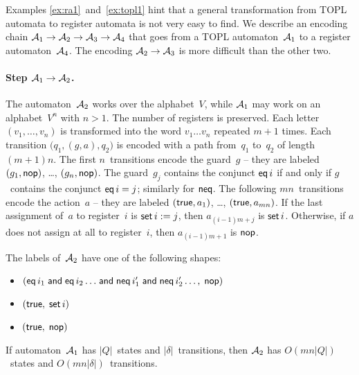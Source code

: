 \documentclass[9pt, preprint]{sigplanconf} %
\theoremstyle{definition}
\theoremstyle{remark}
\begin{document}
Examples \ref{ex:ra1}~and~\ref{ex:topl1} hint that a general  transformation from TOPL automata to register automata is not very easy to find.
We describe an encoding chain ${\cal A}_1\to{\cal A}_2\to{\cal A}_3\to{\cal A}_4$ that goes from a TOPL automaton~${\cal A}_1$ to a register automaton~${\cal A}_4$.
The encoding ${\cal A}_2\to{\cal A}_3$ is more difficult than the other two.

\paragraph{Step ${\cal A}_1\to{\cal A}_2$.}
The automaton~${\cal A}_2$ works over the alphabet~$V$, while ${\cal A}_1$ may work on an alphabet~$V^n$ with $n>1$.
The number of registers is preserved.
Each letter $(v_1,\ldots,v_n)$ is transformed into the word $v_1\ldots v_n$ repeated $m+1$ times.
Each transition $\bigl(q_1,(g,a),q_2\bigr)$ is encoded with a path from~$q_1$ to~$q_2$ of length $(m+1)n$.
The first $n$~transitions encode the guard~$g$ -- they are labeled $(g_1,{\sf nop})$, \dots, $(g_n,{\sf nop})$.
The guard~$g_j$ contains the conjunct ${\sf eq}\,i$ if and only if $g$~contains the conjunct ${\sf eq}\,i=j$; similarly for ${\sf neq}$.
The following $mn$~transitions encode the action~$a$ -- they are labeled $({\sf true}, a_1)$, \dots, $({\sf true}, a_{mn})$.
If the last assignment of~$a$ to register~$i$ is ${\sf set}\,i:=j$, then $a_{(i-1)m+j}$ is ${\sf set}\,i$.
Otherwise, if $a$ does not assign at all to register~$i$, then $a_{(i-1)m+1}$ is ${\sf nop}$.

The labels of~${\cal A}_2$ have one of the following shapes:
\begin{itemize}
\item $({\sf eq}\,i_1\mathrel{\sf and}{\sf eq}\,i_2\ldots
  \mathrel{\sf and}{\sf neq}\,i'_1\mathrel{\sf and}{\sf neq}\,i'_2\ldots,\;
  {\sf nop})$
\item $({\sf true},\;{\sf set}\,i)$
\item $({\sf true},\;{\sf nop})$
\end{itemize}
If automaton~${\cal A}_1$ has $|Q|$~states and $|\delta|$~transitions, then ${\cal A}_2$ has $O(mn|Q|)$~states and $O(mn|\delta|)$~transitions.
\end{document}
